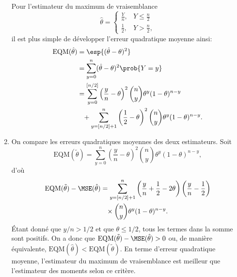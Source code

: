 \begin{exercice}
\begin{sol}
\begin{enumerate}
      Pour l'estimateur du maximum de vraisemblance
      \begin{equation*}
        \hat{\theta} =
        \begin{cases}
          \frac{Y}{n}, & Y \leq \frac{n}{2} \\
          \frac{1}{2}, & Y > \frac{n}{2},
        \end{cases}
      \end{equation*}
      il est plus simple de développer l'erreur quadratique moyenne
      ainsi:
      \begin{align*}
        \mbox{EQM}(\hat{\theta}) &= \esp{(\hat{\theta} - \theta)^2} \\
        &= \sum_{y = 0}^n (\hat{\theta} - \theta)^2 \prob{Y = y} \\
        &= \sum_{y = 0}^{[n/2]}
        \left(
          \frac{y}{n} - \theta
        \right)^2 \binom{n}{y} \theta^y (1 - \theta)^{n - y} \\
        &\phantom{=} +
        \sum_{y = [n/2] + 1}^n
        \left(
          \frac{1}{2} - \theta
        \right)^2 \binom{n}{y} \theta^y (1 - \theta)^{n - y}.
      \end{align*}
    \item On compare les erreurs quadratiques moyennes des deux
      estimateurs. Soit
      \begin{displaymath}
        \mbox{EQM}(\tilde{\theta}) = \sum_{y = 0}^n
        \left(
          \frac{y}{n} - \theta
        \right)^2 \binom{n}{y} \theta^y (1 - \theta)^{n - y},
      \end{displaymath}
      d'où
      \begin{align*}
        \mbox{EQM}(\tilde{\theta}) - \MSE(\hat{\theta}) &=
        \sum_{y=[n/2] + 1}^n
        \left(
          \frac{y}{n} + \frac{1}{2} - 2 \theta
        \right)
        \left(
          \frac{y}{n} - \frac{1}{2}
        \right) \\
        &\phantom{=} \times
        \binom{n}{y} \theta^y (1 - \theta)^{n - y}.
      \end{align*}
      Étant donné que $y/n > 1/2$ et que $\theta \leq 1/2$, tous les
      termes dans la somme sont positifs. On a donc que
      $\mbox{EQM}(\tilde{\theta}) - \MSE(\hat{\theta}) > 0$ ou, de manière
      équivalente, $\mbox{EQM}(\hat{\theta}) < \mbox{EQM}(\tilde{\theta})$. En terme
      d'erreur quadratique moyenne, l'estimateur du maximum de
      vraisemblance est meilleur que l'estimateur des moments selon ce critère.
    \end{enumerate}
  \end{sol}
\end{exercice}


